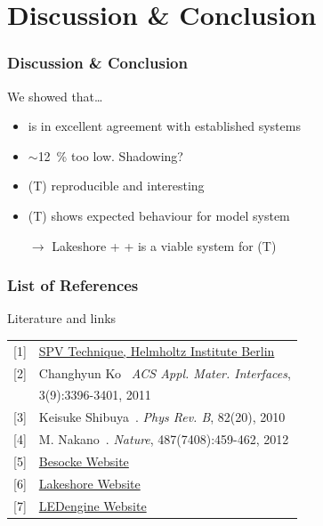 \documentclass{beamer}
\begin{document}
\section{Discussion \& Conclusion}
\begin{frame}
\frametitle{Discussion \& Conclusion}
\begin{block}{We showed that\dots}
\centering
\begin{itemize}
	\item \cpd{} is in excellent agreement with established systems
	\item \spv{} $\sim$\SI{12}{\percent} too low. Shadowing?
	\item \cpd{}(T) reproducible and interesting
	\item \spv{}(T) shows expected behaviour for model system
	\item[$\rightarrow$] Lakeshore + \McA{} + \led{} is a viable system for \spv{}(T)
\end{itemize}
\end{block}\end{frame}

\begin{frame}
\frametitle{List of References}
\begin{block}{Literature and links}
\centering
	\begin{tabular}{r l}
	\textcolor{RUred}{[1]} & \href{https://www.helmholtz-berlin.de/media/media/forschung/energie/heterogen/eta/methods/spv-techniques-2010-08-09.pdf}{SPV Technique, Helmholtz Institute Berlin}\\
	\textcolor{RUred}{[2]} & Changhyun Ko~\etal{} \emph{ACS Appl. Mater. Interfaces}, \\
	& 3(9):3396-3401, 2011\\
	\textcolor{RUred}{[3]} & Keisuke Shibuya~\etal{}. \emph{Phys Rev. B}, 82(20), 2010 \\
	\textcolor{RUred}{[4]} & M. Nakano~\etal{}. \emph{Nature}, 487(7408):459-462, 2012 \\
	\textcolor{RUred}{[5]} & \href{http://www.besocke-delta-phi.de/kelvin.htm}{Besocke Website} \\
	\textcolor{RUred}{[6]} & \href{http://lakeshore.com/products/cryogenic-probe-stations/
model-ttpx-cryogenic-probe-station/pages/Overview.aspx}{Lakeshore Website} \\
	\textcolor{RUred}{[7]} & \href{http://www.ledengin.com/files/products/LZP/
LZP-00CW0R.pdf}{LEDengine Website}
	\end{tabular}
\end{block}\end{frame}
\end{document}
